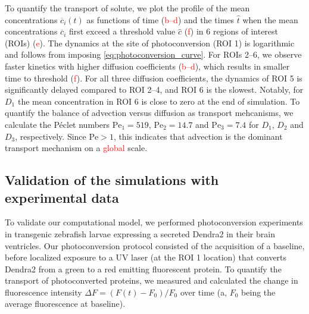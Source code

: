 \documentclass[fleqn]{wlscirep}
\newcommand{\cbar}{\overline{c}}
\newcommand{\fixme}[1]{\textcolor{red}{#1}}
\begin{document}
To quantify the transport of solute, we plot the profile of the mean
concentrations $\cbar_i(t)$ as functions of time
(\fixme{b--d}) and
the times $\hat{t}$ when the mean concentrations $\cbar_i$ first exceed
a threshold value $\hat{c}$ (\fixme{f})
in 6 regions of interest (ROIs) (\fixme{e}).
The dynamics at the site of photoconversion (ROI 1)
is logarithmic and follows from imposing \eqref{eq:photoconversion_curve}.
For ROIs 2--6, we observe faster kinetics with higher diffusion coefficients
(\fixme{b--d}),
which results in smaller time to threshold
(\fixme{f}).
For all three diffusion coefficients, the dynamics of ROI 5
is significantly delayed compared to ROI 2--4,
and ROI 6 is the slowest. Notably, for $D_1$ the mean concentration
in ROI 6 is close to zero at the end of simulation.
To quantify the balance of advection versus diffusion as transport mehcanisms,
we calculate the Péclet numbers $\mathrm{Pe}_1=519$,
$\mathrm{Pe}_2=14.7$ and $\mathrm{Pe}_3=7.4$ for $D_1$, $D_2$ and $D_3$, respectively.
Since $\mathrm{Pe}>1$, this indicates that advection is the
dominant transport mechanism on a \fixme{global} scale.
 
\subsection*{Validation of the simulations with experimental data}
To validate our computational model, we performed photoconversion experiments
in transgenic zebrafish larvae expressing a secreted Dendra2 in their brain ventricles.
Our photoconversion protocol consisted of the acquisition of a baseline,
before localized exposure to a UV laser (at the ROI 1 location)
that converts Dendra2 from a green to a red emitting fluorescent protein. 
To quantify the transport of photoconverted proteins, we measured and
calculated the change in fluorescence intensity $\Delta F = (F(t)-F_0)/F_0$
over time (a,
$F_0$ being the average fluorescence at baseline). 
\end{document}
